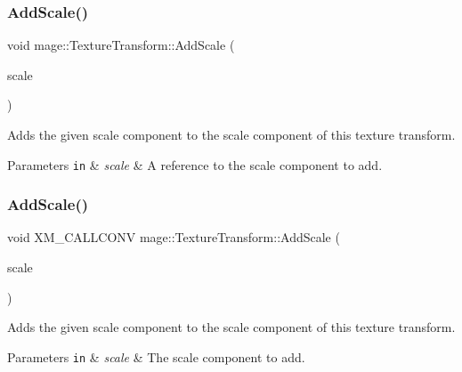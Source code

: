 \subsubsection{\texorpdfstring{Add\+Scale()}{AddScale()}\hspace{0.1cm}{\footnotesize\ttfamily [3/4]}}
{\footnotesize\ttfamily void mage\+::\+Texture\+Transform\+::\+Add\+Scale (\begin{DoxyParamCaption}\item[{const \hyperlink{namespacemage_aa87237ad091f5cd7da612b8523fc108f}{F32x2} \&}]{scale }\end{DoxyParamCaption})\hspace{0.3cm}{\ttfamily [noexcept]}}

Adds the given scale component to the scale component of this texture transform.


\begin{DoxyParams}[1]{Parameters}
\mbox{\tt in}  & {\em scale} & A reference to the scale component to add. \\
\hline
\end{DoxyParams}
\hypertarget{classmage_1_1_texture_transform_a6fa7617e33c123fd09b9f1c7e06afaa1}{}\label{classmage_1_1_texture_transform_a6fa7617e33c123fd09b9f1c7e06afaa1} 
\subsubsection{\texorpdfstring{Add\+Scale()}{AddScale()}\hspace{0.1cm}{\footnotesize\ttfamily [4/4]}}
{\footnotesize\ttfamily void X\+M\+\_\+\+C\+A\+L\+L\+C\+O\+NV mage\+::\+Texture\+Transform\+::\+Add\+Scale (\begin{DoxyParamCaption}\item[{F\+X\+M\+V\+E\+C\+T\+OR}]{scale }\end{DoxyParamCaption})\hspace{0.3cm}{\ttfamily [noexcept]}}

Adds the given scale component to the scale component of this texture transform.


\begin{DoxyParams}[1]{Parameters}
\mbox{\tt in}  & {\em scale} & The scale component to add. \\
\hline
\end{DoxyParams}
\hypertarget{classmage_1_1_texture_transform_a6b15e635a3210008086786c274233acb}{}\label{classmage_1_1_texture_transform_a6b15e635a3210008086786c274233acb} 
